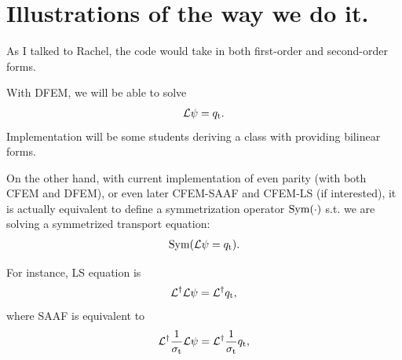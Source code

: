 \documentclass[letterpaper,11pt]{texMemo}
\newcommand{\sigt}{\sigma_\mathrm{t}}
\begin{document}
\section{Illustrations of the way we do it.}
{
	As I talked to Rachel, the code would take in both first-order and second-order forms.
	
	With DFEM, we will be able to solve
	\begin{align}
	\mathcal{L}\psi=q_{\mathrm{t}}.
	\end{align}
	Implementation will be some students deriving a class with providing bilinear forms.
	
	On the other hand, with current implementation of even parity (with both CFEM and DFEM), or even later CFEM-SAAF and CFEM-LS (if interested), it is actually equivalent to define a symmetrization operator $\mathrm{Sym}(\cdot)$ s.t. we are solving a symmetrized transport equation:
	\begin{align}
	\mathrm{Sym}(\mathcal{L}\psi=q_{\mathrm{t}}).
	\end{align}
	
	For instance, LS equation is
	\begin{equation}
	\mathcal{L}^\dagger\mathcal{L}\psi=\mathcal{L}^\dagger q_{\mathrm{t}},
	\end{equation}
	where SAAF is equivalent to
	\begin{equation}
	\mathcal{L}^\dagger\frac{1}{\sigt}\mathcal{L}\psi=\mathcal{L}^\dagger\frac{1}{\sigt}\qscat,
	\end{equation}
}
\end{document}
